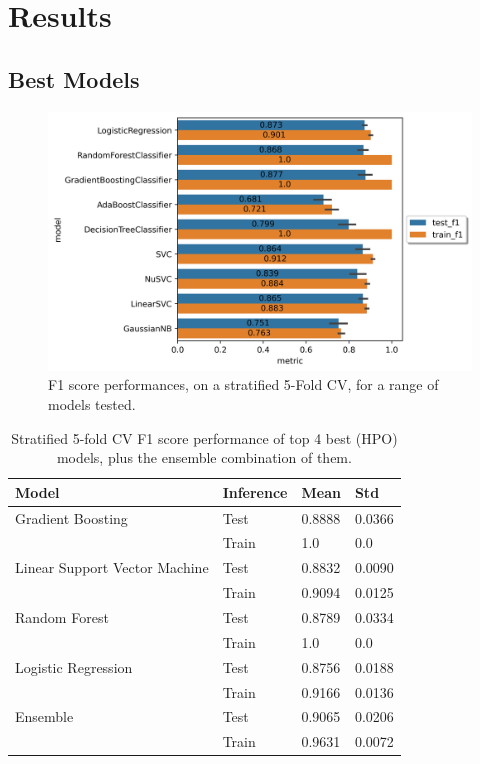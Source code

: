 \documentclass{IEEEtran}
\begin{document}

\section{Results}

\subsection{Best Models}

\begin{figure}[h!]
  \centering
  \includegraphics[width=\columnwidth]{figures/models_unturned_f1.png}
  \caption{F1 score performances, on a stratified 5-Fold CV, for a range of models tested.}
  \label{fig:models_untuned}
\end{figure}

\begin{table}[h!]
  \centering
  \begin{tabular}{|l|l|l|l|}
  \hline
  \textbf{Model} & \textbf{Inference} & \textbf{Mean} & \textbf{Std} \\
  \hline
  Gradient Boosting & Test & 0.8888 & 0.0366 \\
   & Train & 1.0 & 0.0 \\
  \hline
  Linear Support Vector Machine & Test & 0.8832 & 0.0090 \\
   & Train & 0.9094 & 0.0125 \\
  \hline
  Random Forest & Test & 0.8789 & 0.0334 \\
   & Train & 1.0 & 0.0 \\
  \hline
  Logistic Regression & Test & 0.8756 & 0.0188 \\
   & Train & 0.9166 & 0.0136 \\
  \hline
  Ensemble & Test & 0.9065 & 0.0206 \\
   & Train & 0.9631 & 0.0072 \\
  \hline
  \end{tabular}
  \caption{Stratified 5-fold CV F1 score performance of top 4 best (HPO) models, plus the ensemble combination of them.}
  \label{tab:best_model_scores}
\end{table}
\end{document}
